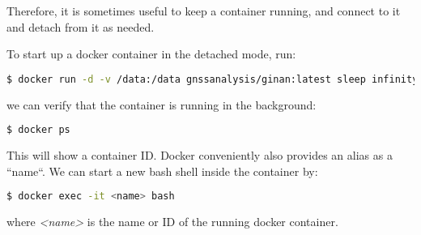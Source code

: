 Therefore, it is sometimes useful to keep a container running, and connect to it and detach
from it as needed.

To start up a docker container in the detached mode, run:
\begin{lstlisting}[language=bash]
$ docker run -d -v /data:/data gnssanalysis/ginan:latest sleep infinity
\end{lstlisting}
we can verify that the container is running in the background:
\begin{lstlisting}[language=bash]
$ docker ps
\end{lstlisting}
This will show a container ID. Docker conveniently also provides an alias as a ``name``.
We can start a new bash shell inside the container by:
\begin{lstlisting}[language=bash]
$ docker exec -it <name> bash
\end{lstlisting}
where \emph{<name>} is the name or ID of the running docker container.
